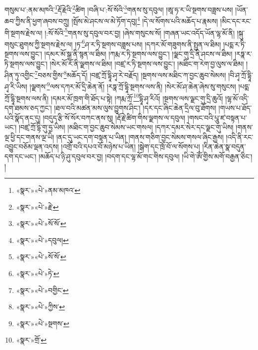 གསུམ་པ་:ནམ་མཁའི་\footnote{«སྣར་»«པེ་»ནམ་མཁའ་}རྡོ་རྗེའི་\footnote{«སྣར་»«པེ་»རྗེ་}ཚིག །བཞི་པ་:སོ་སོའི་\footnote{«སྣར་»«པེ་»སོ་སོ་}གནས་སུ་དབུལ། །ཨཱ་ཧ་ར་ཡི་སྔགས་བཟླས་པས། །ཡོན་ཆབ་ཀྱིས་ནི་ཕྱག་ཞབས་བཀྲུ། །སྤོས་མེ་ཤངས་ལ་མེ་ཏོག་དབུ།\footnote{«སྣར་»«པེ་»དབུལ།} །དེ་ལ་སོགས་པའི་མཆོད་པ་རྣམས། །མིང་དང་རང་གི་སྔགས་རྗེས་ལ། །:སོ་སོའི་\footnote{«སྣར་»«པེ་»སོ་སོ་}གནས་སུ་དབུལ་བར་བྱ། །ཞེས་གསུངས་སོ། །གཞན་ཡང་འདོད་ཡོན་ལྷ་མོ་ནི། །སྐུ་གསུང་ཐུགས་ཀྱི་སྔགས་རྗེས་ལ། །ཏ་\footnote{«སྣར་»«པེ་»ཏེ་}ཤ་ར་ཏི་སྔགས་བཟླས་པས། །དཀར་མོ་གཟུགས་ནི་སྤྱན་ལ་ཐིམ། །པདྨ་ར་ཏི་སྔགས་ལས་བྱུང་། །དམར་མོ་སྒྲ་ནི་སྙན་ལ་ཐིམ། །ཀརྨ་ར་ཏི་སྔགས་ལས་བྱུང་། །ལྗང་གུ་དྲི་ནི་ཤངས་ལ་ཐིམ། །རཏྣ་ར་ཏི་སྔགས་ལས་བྱུང་། །སེར་མོ་རོ་ནི་ལྗགས་ལ་ཐིམ། །བཛྲ་ར་ཏི་སྔགས་ལས་བྱུང་། །མཐིང་ག་རེག་བྱ་ལུས་ལ་ཐིམ། །ཤིན་ཏུ་འགྱིང་\footnote{«སྣར་»«པེ་»བགྱིང་}བཅས་གྱིས་\footnote{«སྣར་»«པེ་»ཀྱིས་}མཆོད་དོ། །བཛྲ་ཀྲོ་དྷཱི་ཤྭ་རེ་བརྗོད། །སྔགས་ལས་མཐིང་ཀ་བྱང་ཆུབ་སེམས། །བི་ཤྭ་ཀྲོ་དྷཱི་ཤྭ་རི་ཡིས། །ལྗགས་\footnote{«སྣར་»«པེ་»སྔགས་}ལས་དཀར་མོ་དྲི་ཆེན་ནོ། །རཏྣ་ཀྲོ་དྷཱི་སྔགས་ལས་ནི། །སེར་མོ་ཤ་ཆེན་ཞེས་སུ་གསུངས། །པདྨ་ཀྲོ་དྷཱི་སྔགས་ལས་ནི། །དམར་མོ་ཁྲག་གི་ཐོད་པ་སྟེ། །ཀརྨ་ཀྲོ་\footnote{«སྣར་»གྲོ་}དྷཱི་ཤྭ་རིའོ། །སྔགས་ལས་ལྗང་གུ་དྲི་ཆུའོ། །ལྷ་མོ་འདི་དག་ཐམས་ཅད་ཀྱང་། །ཐལ་བའི་མཚན་མས་ལུས་བྱུགས་ཤིང་། །དར་དང་ཞིང་ཆེན་དྲིལ་བུ་ཐོགས། །གཡས་པ་ཐོད་པའི་སྣོད་ནང་དུ། །བདུད་རྩི་སོ་སོར་བཀང་ནས་སུ། །རྡོ་རྗེ་ཚིག་གིས་ལྗགས་ལ་དབུལ། །གསང་བའི་པཱུ་ཛ་བསྟན་པ་ཡང་། །བཛྲ་ཀྲོ་དྷི་གུ་ཧྱ་ཡིས། །མཐིང་ག་བྱང་ཆུབ་སེམས་ཡང་གསལ། །དཀར་དམར་སེར་དང་ལྗང་གུ་ཡིས། །གནས་ལྔ་ཕྱི་དང་གནས་ལྔ་ཡི། །ནང་དུ་ཡང་དག་བསྟན་པ་ཡིན། །གནས་གཅིག་བྱང་སེམས་གསལ་ཞིང་རྒྱས། །འདི་ནི་རང་འབྱུང་བཅོམ་ལྡན་འདས། །འགྲོ་བའི་དཔའ་བོ་མཉེས་པ་ཡིན། །སྒེག་དང་ཁྲོ་བོ་ལ་སོགས་པ། །རིན་ཆེན་སྣ་བདུན་དག་དང་ཡང་། །མཆོད་པ་ཉི་ཤུ་དབུལ་བར་བྱ། །བདག་དང་ལྷ་མོ་གང་གིས་དབུལ། །ཡི་གེ་ཨོཾ་གྱིས་མགོ་བརྒྱན་ཅིང་། །
